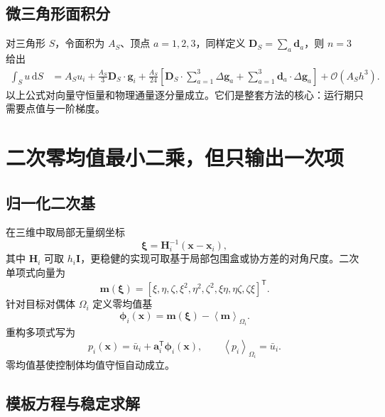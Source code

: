 \documentclass[UTF8,a4paper,11pt,openany]{ctexrep}
\numberwithin{equation}{chapter}
\newcommand{\dd}{\,\mathrm d}
\newcommand{\Order}{\mathcal O}
\newcommand{\avg}[1]{\left\langle #1\right\rangle}
\newcommand{\transpose}{\mathsf T}
\begin{document}
\subsection{微三角形面积分}

对三角形 $S$，令面积为 $A_S$、顶点 $a=1,2,3$，同样定义 $\bm D_S=\sum_a\bm d_a$，则 $n=3$ 给出
\begin{align}
  \int_Su\dd S
  &=A_Su_i+\frac{A_S}{3}\bm D_S\cdot\bm g_i
  +\frac{A_S}{24}\left[
       \bm D_S\cdot\sum_{a=1}^{3}\Delta\bm g_a
       +\sum_{a=1}^{3}\bm d_a\cdot\Delta\bm g_a
    \right]
  +\Order(A_Sh^3).
  \label{eq:triquad}
\end{align}
以上公式对向量守恒量和物理通量逐分量成立。它们是整套方法的核心：运行期只需要点值与一阶梯度。

\section{二次零均值最小二乘，但只输出一次项}

\subsection{归一化二次基}

在三维中取局部无量纲坐标
\begin{equation}
  \bm\xi=\bm H_i^{-1}(\bm x-\bm x_i),
\end{equation}
其中 $\bm H_i$ 可取 $h_i\bm I$，更稳健的实现可取基于局部包围盒或协方差的对角尺度。二次单项式向量为
\begin{equation}
 \bm m(\bm\xi)=
 [\xi,\eta,\zeta,\xi^2,\eta^2,\zeta^2,\xi\eta,\eta\zeta,\zeta\xi]^{\transpose}.
\end{equation}
针对目标对偶体 $\Omega_i$ 定义零均值基
\begin{equation}
  \bm\phi_i(\bm x)=\bm m(\bm\xi)-\avg{\bm m}_{\Omega_i}.
\end{equation}
重构多项式写为
\begin{equation}
  p_i(\bm x)=\bar u_i+\bm a_i^{\transpose}\bm\phi_i(\bm x),
  \qquad \avg{p_i}_{\Omega_i}=\bar u_i.
  \label{eq:zeromeanpoly}
\end{equation}
零均值基使控制体均值守恒自动成立。

\subsection{模板方程与稳定求解}
\end{document}
